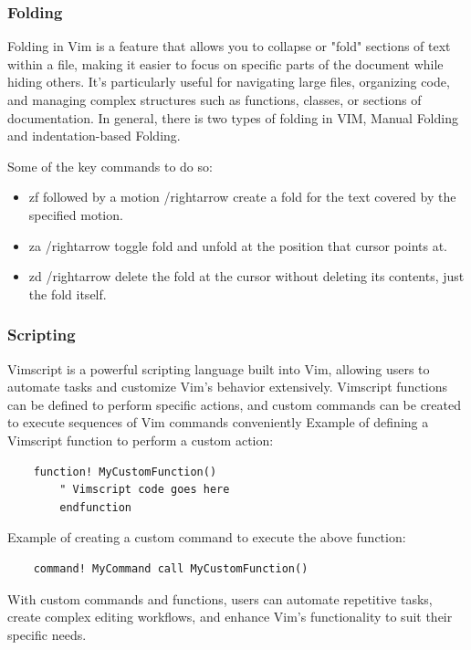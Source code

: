 \documentclass{article}
\begin{document}
	\subsubsection{Folding}
	Folding in Vim is a feature that allows you to collapse or "fold" sections of text within a file, making it easier to focus on specific parts of the document while hiding others.
	It's particularly useful for navigating large files, organizing code, and managing complex structures such as functions, classes, or sections of documentation.
	In general, there is two types of folding in VIM, Manual Folding and indentation-based Folding.

	Some of the key commands to do so:
	\begin{itemize}
		\item zf followed by a motion /rightarrow create a fold for the text covered by the specified motion.
		\item za /rightarrow toggle fold and unfold at the position that cursor points at.
		\item zd /rightarrow delete the fold at the cursor without deleting its contents, just the fold itself.
	\end{itemize}

	\subsubsection{Scripting}
	Vimscript is a powerful scripting language built into Vim, allowing users to automate tasks and customize Vim's behavior extensively.
	Vimscript functions can be defined to perform specific actions, and custom commands can be created to execute sequences of Vim commands conveniently
	Example of defining a Vimscript function to perform a custom action:

	\begin{lstlisting}
	function! MyCustomFunction()
    	" Vimscript code goes here
		endfunction
	\end{lstlisting}

	Example of creating a custom command to execute the above function:

	\begin{lstlisting}
	command! MyCommand call MyCustomFunction()
	\end{lstlisting}


	With custom commands and functions, users can automate repetitive tasks, create complex editing workflows, and enhance Vim's functionality to suit their specific needs.
\end{document}
